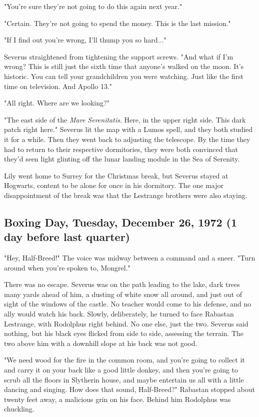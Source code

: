 \documentclass[a4paper,11pt]{article}
\begin{document}
"You're sure they're not going to do this again next year."

"Certain. They're not going to spend the money. This is the last mission."

"If I find out you're wrong, I'll thump you so hard..."

Severus straightened from tightening the support screws. "And what if I'm wrong? This is still just the sixth time that anyone's walked on the moon. It's historic. You can tell your grandchildren you were watching. Just like the first time on television. And Apollo 13."

"All right. Where are we looking?"

"The east side of the \emph{Mare Serenitatis}. Here, in the upper right side. This dark patch right here." Severus lit the map with a Lumos spell, and they both studied it for a while. Then they went back to adjusting the telescope. By the time they had to return to their respective dormitories, they were both convinced that they'd seen light glinting off the lunar landing module in the Sea of Serenity.

Lily went home to Surrey for the Christmas break, but Severus stayed at Hogwarts, content to be alone for once in his dormitory. The one major disappointment of the break was that the Lestrange brothers were also staying.

\subsection{Boxing Day, Tuesday, December 26, 1972 (1 day before last quarter)}

"Hey, Half-Breed!" The voice was midway between a command and a sneer. "Turn around when you're spoken to, Mongrel."

There was no escape. Severus was on the path leading to the lake, dark trees many yards ahead of him, a dusting of white snow all around, and just out of sight of the windows of the castle. No teacher would come to his defense, and no ally would watch his back. Slowly, deliberately, he turned to face Rabastan Lestrange, with Rodolphus right behind. No one else, just the two. Severus said nothing, but his black eyes flicked from side to side, assessing the terrain. The two above him with a downhill slope at his back was not good.

"We need wood for the fire in the common room, and you're going to collect it and carry it on your back like a good little donkey, and then you're going to scrub all the floors in Slytherin house, and maybe entertain us all with a little dancing and singing. How does that sound, Half-Breed?" Rabastan stopped about twenty feet away, a malicious grin on his face. Behind him Rodolphus was chuckling.
\end{document}
